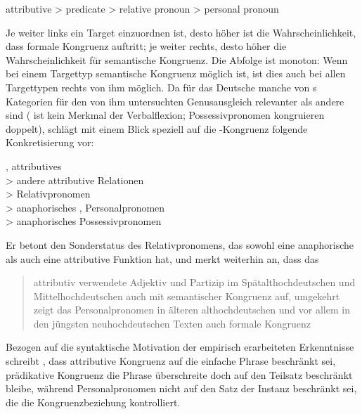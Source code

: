 \begin{exe}
\ex attributive > predicate > relative pronoun > personal pronoun
\end{exe}

Je weiter links ein Target einzuordnen ist, desto höher ist die
Wahrscheinlichkeit, dass formale Kongruenz auftritt; je weiter rechts, desto
höher die Wahrscheinlichkeit für semantische Kongruenz. Die Abfolge ist
monoton: Wenn bei einem Targettyp semantische Kongruenz möglich ist, ist dies
auch bei allen Targettypen rechts von ihm möglich. Da für das
Deutsche manche von \citeauthor{corbett1979}s Kategorien für
den von ihm untersuchten Genusausgleich relevanter als andere sind (
ist kein Merkmal der Verbalflexion; Possessivpronomen kongruieren doppelt),
schlägt \citet[193]{fleischer2012} mit einem Blick speziell auf die
-Kongruenz folgende Konkretisierung vor:

\begin{exe}
\ex {}, attributives  \\
	\hspace*{1em} > andere attributive Relationen \\
	\hspace*{2em} > Relativpronomen \\
	\hspace*{3em} > anaphorisches , Personalpronomen \\
	\hspace*{4em} > anaphorisches Possessivpronomen
\end{exe}

Er betont den Sonderstatus des Relativpronomens, das sowohl eine
anaphorische als auch eine attributive Funktion hat,
und merkt weiterhin an, dass das \blockcquote[194]{fleischer2012}{attributiv
verwendete Adjektiv und Partizip \textelp{} im
Spätalthochdeutschen und
Mittelhochdeutschen auch mit semantischer Kongruenz
auf, umgekehrt zeigt das Personalpronomen in älteren
althochdeutschen und vor allem in den jüngsten
neuhochdeutschen Texten auch formale Kongruenz}.

Bezogen auf die syntaktische Motivation der empirisch erarbeiteten Erkenntnisse
schreibt \citet[216]{corbett1979}, dass attributive Kongruenz auf die einfache
Phrase beschränkt sei, prädikative Kongruenz die Phrase überschreite doch auf
den Teilsatz beschränkt bleibe, während Personalpronomen nicht auf den Satz der
Instanz beschränkt sei, die die Kongruenzbeziehung kontrolliert.

